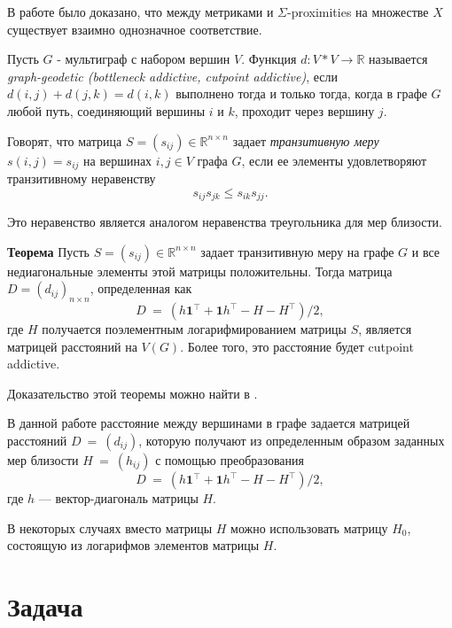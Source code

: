 В работе \cite{chebotarev2013studying} было доказано, что между метриками и $\Sigma$-proximities на множестве $X$ существует взаимно однозначное соответствие.

\begin{definition}
Пусть $G$ - мультиграф с набором вершин $V$. Функция $d: V*V \rightarrow \mathbb{R}$ называется \emph{graph-geodetic (bottleneck addictive, cutpoint addictive)}, если $d(i,j)+d(j,k) = d(i,k)$ выполнено тогда и только тогда, когда в графе $G$ любой путь, соединяющий вершины $i$ и $k$, проходит через вершину $j$.
\end{definition}

\begin{definition}
Говорят, что матрица $S=(s_{ij}) \in \mathbb{R}^{n\times n}$ задает \emph{транзитивную меру} $s(i,j) = s_{ij}$ на вершинах $i,j \in V$ графа $G$, если ее элементы удовлетворяют транзитивному неравенству $$s_{ij}s_{jk} \le s_{ik}s_{jj}.$$

Это неравенство является аналогом неравенства треугольника для мер близости.
\end{definition}
\textbf{Теорема}
Пусть $S=(s_{ij}) \in \mathbb{R}^{n\times n}$ задает транзитивную меру на графе $G$ и все недиагональные элементы этой матрицы положительны. Тогда матрица $D = (d_{ij})_{n\times n}$, определенная как
$$D~=~(h \textbf{1}^\intercal + \textbf{1} h^\intercal - H - H ^\intercal) /2,$$ 
где $H$ получается поэлементным логарифмированием матрицы $S$, является матрицей расстояний на $V(G)$. Более того, это расстояние будет cutpoint addictive.

Доказательство этой теоремы можно найти в \cite{chebotarev2005duality}.

В данной работе расстояние между вершинами в графе задается матрицей расстояний $D~=~(d_{ij})$, которую получают из определенным образом заданных мер близости $H~=~(h_{ij})$ с помощью преобразования
$$D~=~(h \textbf{1}^\intercal + \textbf{1} h^\intercal - H - H ^\intercal) /2, $$
где $h$ --- вектор-диагональ матрицы $H$.

В некоторых случаях вместо матрицы $H$ можно использовать матрицу $H_0$, состоящую из логарифмов элементов матрицы $H$.


\clearpage

\section{Задача} \label{sect1_2}

